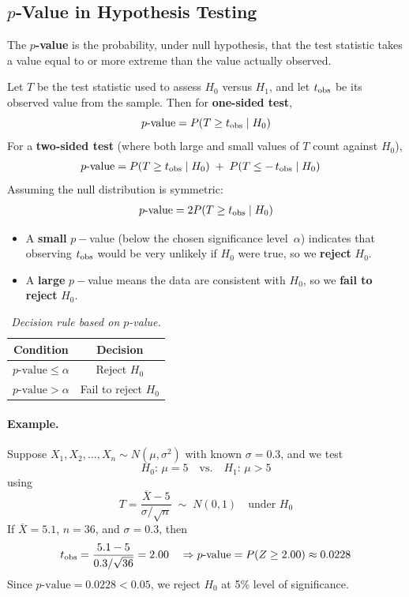 \documentclass[twoside]{book}
\begin{document}
\subsection{$p$‐Value in Hypothesis Testing}

\begin{textbox}
The $p$\textbf{-value} is the probability, under null hypothesis, that the test statistic takes a value equal to or more extreme than the value actually observed.
\end{textbox}

Let $T$ be the test statistic used to assess $H_0$ versus $H_1$, and let $t_{\rm obs}$ be its observed value from the sample. Then for \textbf{one-sided test},
\[
p\text{-value} = P(T \ge t_{\rm obs}\mid H_0)
\]
For a \textbf{two‐sided test} (where both large and small values of $T$ count against $H_0$),
\begin{align*}
p\text{-value} &=
P(T \ge t_{\rm obs}\mid H_0)
\;+\;
P(T \le -\,t_{\rm obs}\mid H_0)
\end{align*}
Assuming the null distribution is symmetric:
\begin{align*}
p\text{-value} =2P(T \ge t_{\rm obs}\mid H_0)
\end{align*}

\begin{itemize}
	\item A \textbf{small} $p-$value (below the chosen significance level~$\alpha$) indicates that observing $t_{\rm obs}$ would be very unlikely if $H_0$ were true, so we \textbf{reject} $H_0$.
	\item A \textbf{large} $p-$value means the data are consistent with $H_0$, so we \textbf{fail to reject} $H_0$.
\end{itemize}

\begin{table}[H]
	\centering
	\vspace{0.5em}
	\renewcommand{\arraystretch}{1.5}
	\begin{tabular}{c|c}
		\toprule
		\textbf{Condition} & \textbf{Decision} \\
		\midrule
		$p\text{-value} \leq \alpha$  & Reject $H_0$ \\
		$p\text{-value} > \alpha$  & Fail to reject $H_0$ \\
		\bottomrule
	\end{tabular}
\caption{\textit{Decision rule based on $p$-value.}}
\end{table}

\paragraph{Example.}
Suppose $X_1,X_2,\dots,X_n\sim N(\mu,\sigma^2)$ with known $\sigma=0.3$, and we test
\[
H_0:\,\mu=5
\quad\text{vs.}\quad
H_1:\,\mu>5
\]
using
\[
T = \frac{\overline X - 5}{\sigma/\sqrt{n}}
\;\sim\; N(0,1)
\quad\text{under }H_0
\]
If $\overline X=5.1$, $n=36$, and $\sigma=0.3$, then
\[
t_{\rm obs}
= \frac{5.1 - 5}{0.3/\sqrt{36}}
= 2.00
\quad
\Rightarrow p\text{-value} = P(Z \ge 2.00) \approx 0.0228
\]
Since $p\text{-value}=0.0228<0.05$, we reject $H_0$ at 5\% level of significance.
\end{document}
